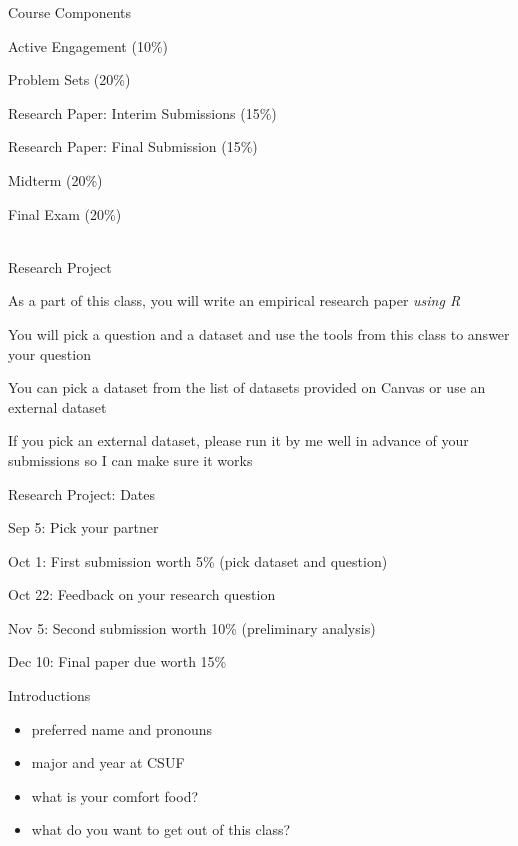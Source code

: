 \documentclass{./../div_teaching_slides}
\begin{document}
\begin{frame}{Course Components}
\begin{witemize}
\item Active Engagement (10\%)
\item Problem Sets (20\%)
\item Research Paper: Interim Submissions (15\%)
\item Research Paper: Final Submission (15\%)
\item Midterm (20\%)
\item Final Exam (20\%) \\~\\
\end{witemize}
\end{frame}

\begin{frame}{Research Project}
\begin{witemize}
\item As a part of this class, you will write an empirical research paper \textit{using R} 
\item You will pick a question and a dataset and use the tools from this class to answer your question 
\item You can pick a dataset from the list of datasets provided on Canvas or use an external dataset 
\item If you pick an external dataset, please run it by me well in advance of your submissions so I can make sure it works
\end{witemize}
\end{frame}

\begin{frame}{Research Project: Dates}
\begin{witemize}
\item Sep 5: Pick your partner
\item Oct 1: First submission worth 5\% (pick dataset and question)
\item Oct 22: Feedback on your research question
\item Nov 5: Second submission worth 10\% (preliminary analysis)
\item Dec 10: Final paper due worth 15\%
\end{witemize}
\end{frame}

\begin{frame}{Introductions}
\begin{itemize}
\item preferred name and pronouns
\item major and year at CSUF 
\item what is your comfort food?
\item what do you want to get out of this class?
\end{itemize}
\end{frame}
\end{document}
